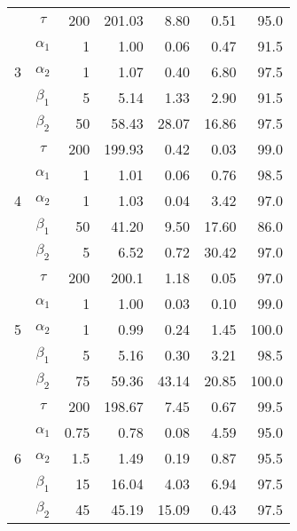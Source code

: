 \documentclass[12pt]{article}
\numberwithin{equation}{section}
\begin{document}
\begin{table}[htp]
\begin{tabular}{ccrrrrr}
		\hline
		\multirow{5}[2]{*}{3} 				
						& $\tau$	 & 200   & 201.03 & 8.80 & 0.51  & 95.0 \\			
						& $\alpha_1$& 1  & 1.00  & 0.06  & 0.47  & 91.5 \\			
						& $\alpha_2$ & 1  & 1.07  & 0.40  & 6.80 & 97.5 \\			
						& $\beta_1$	 & 5    & 5.14    & 1.33  & 2.90 & 91.5 \\			
						& $\beta_2$	& 50    & 58.43 & 28.07 & 16.86  & 97.5 \\					
						\hline
		\multirow{5}[2]{*}{4}
		& $\tau$		     & 200   & 199.93 & 0.42  & 0.03  & 99.0 \\	
		& $\alpha_1$		             & 1     & 1.01  & 0.06  & 0.76  & 98.5 \\	
		& $\alpha_2$		      & 1     & 1.03  & 0.04  & 3.42  & 97.0 \\	
		& $\beta_1$		           & 50    & 41.20  & 9.50   & 17.60  & 86.0 \\	
		& $\beta_2$		           & 5     & 6.52  & 0.72  & 30.42 & 97.0 \\	
		
		\hline
		\multirow{5}[2]{*}{5} 
		& $\tau$		      & 200   & 200.1 & 1.18  & 0.05  & 97.0 \\			
		& $\alpha_1$		                 & 1     & 1.00    & 0.03  & 0.10   & 99.0 \\			
		& $\alpha_2$		               & 1     & 0.99  & 0.24  & 1.45  & 100.0 \\			
		& $\beta_1$		                 & 5     & 5.16  & 0.30   & 3.21  & 98.5 \\			
		& $\beta_2$		                 & 75    & 59.36 & 43.14 & 20.85 & 100.0 \\			
		
		\hline
		\multirow{5}[2]{*}{6} 
		& $\tau$		 & 200   & 198.67 & 7.45  & 0.67  & 99.5 \\			
		& $\alpha_1$		                 & 0.75  & 0.78  & 0.08  & 4.59  & 95.0 \\			
		& $\alpha_2$		           & 1.5   & 1.49  & 0.19  & 0.87  & 95.5 \\			
		& $\beta_1$		          & 15    & 16.04 & 4.03  & 6.94  & 97.5 \\			
		& $\beta_2$		      & 45    & 45.19 & 15.09 & 0.43  & 97.5 \\			
				
		\hline

	\end{tabular}%
	\label{tab:simu1}%
\end{table}%
\end{document}

